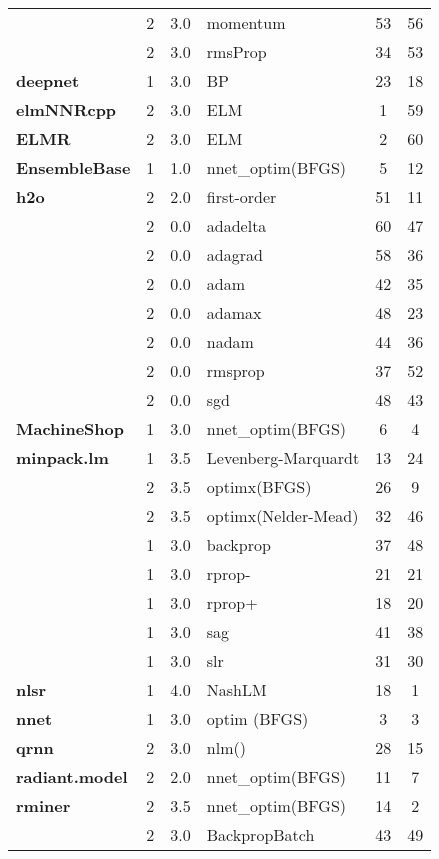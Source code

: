 \begin{Schunk}
\begin{table}
\begin{tabular}[t]{>{\bfseries}lcclcc}
 & 2 & 3.0 & momentum & 53 & 56\\

\multirow{-4}{*}{\raggedright\arraybackslash deepdive} & 2 & 3.0 & rmsProp & 34 & 53\\
\cmidrule{1-6}
deepnet & 1 & 3.0 & BP & 23 & 18\\
\cmidrule{1-6}
elmNNRcpp & 2 & 3.0 & ELM & 1 & 59\\
\cmidrule{1-6}
ELMR & 2 & 3.0 & ELM & 2 & 60\\
\cmidrule{1-6}
EnsembleBase & 1 & 1.0 & nnet\_optim(BFGS) & 5 & 12\\
\cmidrule{1-6}
h2o & 2 & 2.0 & first-order & 51 & 11\\
\cmidrule{1-6}
 & 2 & 0.0 & adadelta & 60 & 47\\

 & 2 & 0.0 & adagrad & 58 & 36\\

 & 2 & 0.0 & adam & 42 & 35\\

 & 2 & 0.0 & adamax & 48 & 23\\

 & 2 & 0.0 & nadam & 44 & 36\\

 & 2 & 0.0 & rmsprop & 37 & 52\\

\multirow{-7}{*}{\raggedright\arraybackslash keras} & 2 & 0.0 & sgd & 48 & 43\\
\cmidrule{1-6}
MachineShop & 1 & 3.0 & nnet\_optim(BFGS) & 6 & 4\\
\cmidrule{1-6}
minpack.lm & 1 & 3.5 & Levenberg-Marquardt & 13 & 24\\
\cmidrule{1-6}
 & 2 & 3.5 & optimx(BFGS) & 26 & 9\\

\multirow{-2}{*}{\raggedright\arraybackslash monmlp} & 2 & 3.5 & optimx(Nelder-Mead) & 32 & 46\\
\cmidrule{1-6}
 & 1 & 3.0 & backprop & 37 & 48\\

 & 1 & 3.0 & rprop- & 21 & 21\\

 & 1 & 3.0 & rprop+ & 18 & 20\\

 & 1 & 3.0 & sag & 41 & 38\\

\multirow{-5}{*}{\raggedright\arraybackslash neuralnet} & 1 & 3.0 & slr & 31 & 30\\
\cmidrule{1-6}
nlsr & 1 & 4.0 & NashLM & 18 & 1\\
\cmidrule{1-6}
nnet & 1 & 3.0 & optim (BFGS) & 3 & 3\\
\cmidrule{1-6}
qrnn & 2 & 3.0 & nlm() & 28 & 15\\
\cmidrule{1-6}
radiant.model & 2 & 2.0 & nnet\_optim(BFGS) & 11 & 7\\
\cmidrule{1-6}
rminer & 2 & 3.5 & nnet\_optim(BFGS) & 14 & 2\\
\cmidrule{1-6}
 & 2 & 3.0 & BackpropBatch & 43 & 49\\


\end{tabular}
\end{table}
\end{Schunk}

